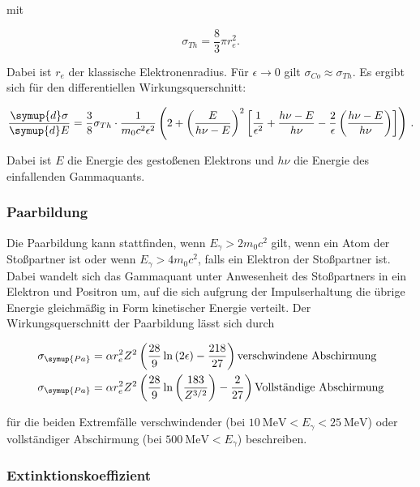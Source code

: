 mit 

\begin{equation*}
    \sigma_{Th} = \frac{8}{3}\pi r_e^2.
\end{equation*}

Dabei ist $r_e$ der klassische Elektronenradius. Für $\epsilon\rightarrow 0$ gilt $\sigma_{Co} \approx \sigma_{Th}$.
Es ergibt sich für den differentiellen Wirkungsquerschnitt:

\begin{equation*}
    \frac{\symup{d}\sigma}{\symup{d}E} = \frac{3}{8}\sigma_{Th}\cdot\frac{1}{m_0 c^2 \epsilon^2}\left(2+\left(\frac{E}{h\nu - E}\right)^2\left[\frac{1}{\epsilon^2}+\frac{h\nu-E}{h\nu}-\frac{2}{\epsilon}\left(\frac{h\nu-E}{h\nu}\right)\right]\right)\,.
\end{equation*}

Dabei ist $E$ die Energie des gestoßenen Elektrons und $h\nu$ die Energie des einfallenden Gammaquants.

\subsubsection{Paarbildung}

Die Paarbildung kann stattfinden, wenn $E_\gamma>2m_0c^2$ gilt, wenn ein Atom der Stoßpartner ist oder wenn $E_\gamma > 4m_0c^2$, falls 
ein Elektron der Stoßpartner ist. Dabei wandelt sich das Gammaquant unter Anwesenheit des Stoßpartners in ein Elektron und Positron um, 
auf die sich aufgrung der Impulserhaltung die übrige Energie gleichmäßig in Form kinetischer Energie verteilt. Der Wirkungsquerschnitt
der Paarbildung lässt sich durch 

\begin{align*}
    \sigma_{\symup{Pa}} &= \alpha r_e^2 Z^2\left(\frac{28}{9}\ln{\left(2\epsilon\right)}-\frac{218}{27}\right)\textrm{verschwindene Abschirmung}\\
    \sigma_{\symup{Pa}} &= \alpha r_e^2 Z^2\left(\frac{28}{9}\ln{\left(\frac{183}{Z^{3/2}}\right)}-\frac{2}{27}\right) \textrm{Vollständige Abschirmung}
\end{align*}

für die beiden Extremfälle verschwindender (bei $\SI{10}{\mega\eV}<E_\gamma<\SI{25}{\mega\eV}$) oder vollständiger Abschirmung (bei $\SI{500}{\mega\eV}<E_\gamma$) beschreiben.

\subsubsection*{Extinktionskoeffizient}

